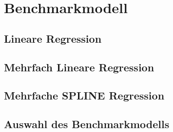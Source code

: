 \section{Benchmarkmodell}

\subsection{Lineare Regression}

\subsection{Mehrfach Lineare Regression}

\subsection{Mehrfache SPLINE Regression}

\subsection{Auswahl des Benchmarkmodells}